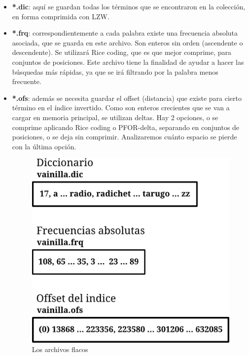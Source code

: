\begin{itemize}

\item \textbf{*.dic}: aquí se guardan todas los términos que se encontraron en la colección, en forma comprimida con LZW.

\item \textbf{*.frq}: correspondientemente a cada palabra existe una frecuencia absoluta asociada, que se guarda en este archivo. Son enteros sin orden (ascendente o descendente). Se utilizará Rice coding, que es que mejor comprime, para conjuntos de posiciones. Este archivo tiene la finalidad de ayudar a hacer las búsquedas más rápidas, ya que se irá filtrando por la palabra menos frecuente.

\item \textbf{*.ofs}: además se necesita guardar el offset (distancia) que existe para cierto término en el índice invertido. Como son enteros crecientes que se van a cargar en memoria principal, se utilizan deltas. Hay 2 opciones, o se comprime aplicando Rice coding o PFOR-delta, separando en conjuntos de posiciones, o se deja sin comprimir. Analizaremos cuánto espacio se pierde con la última opción.


\begin{figure}[!h]
\centering
    \includegraphics[scale=0.9]{./Images/estructura_2.png}
\caption{Los archivos flacos}
\label{fig:flacos}
\end{figure}



\end{itemize}


